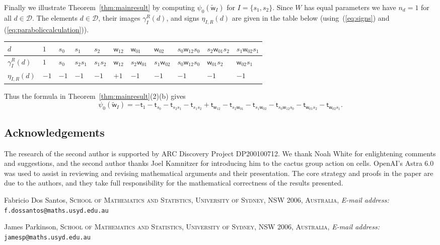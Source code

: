 \documentclass[11pt]{article}
\theoremstyle{plain}
\theoremstyle{definition}
\numberwithin{equation}{section}
\def\tw{\widetilde{\mathsf{w}}_I}
\def\cD{\mathcal{D}}
\newcommand{\sw}{\mathsf{w}}
\newcommand{\st}{\mathsf{t}}
\begin{document}
Finally we illustrate Theorem~\ref{thm:mainresult} by computing $\psi_0(\tw)$ for $I=\{s_1,s_2\}$. Since $W$ has equal parameters we have $n_d=1$ for all $d\in\cD$. The elements $d\in\cD$, their images $\gamma_I^R(d)$, and signs $\eta_{I,R}(d)$ are given in the table below (using~(\ref{eq:signs}) and (\ref{eq:paraboliccalculation})). 
\begin{center}
\begin{tabular}{l||l|l|l|l|l|l|l|l|l|l|}
$d$&$1$&$s_0$&$s_1$&$s_2$&$\sw_{12}$&$\sw_{01}$&$\sw_{02}$&$s_0\sw_{12}s_0$&$s_2\sw_{01}s_2$&$s_1\sw_{02}s_1$\\
\hline
$\gamma_I^R(d)$&$1$&$s_0$&$s_2s_1$&$s_1s_2$&$\sw_{12}$&$s_2\sw_{01}$&$s_1\sw_{02}$&$s_0\sw_{12}s_0$&$\sw_{01}s_2$&$\sw_{02}s_1$\\
\hline
$\eta_{I,R}(d)$&$-1$&$-1$&$-1$&$-1$&$+1$&$-1$&$-1$&$-1$&$-1$&$-1$\\
\hline
\end{tabular}
\end{center}
Thus the formula in Theorem~\ref{thm:mainresult}(2)(b) gives
$$
\psi_0(\tw)=-\st_1-\st_{s_0}-\st_{s_2s_1}-\st_{s_1s_2}+\st_{\sw_{12}}-\st_{s_2\sw_{01}}-\st_{s_1\sw_{02}}-\st_{s_0\sw_{12}s_0}-\st_{\sw_{01}s_2}-\st_{\sw_{02}s_1}.
$$


\subsection*{Acknowledgements} The research of the second author is supported by ARC Discovery Project DP200100712. We thank Noah White for enlightening comments and suggestions, and the second author thanks Joel Kamnitzer for introducing him to the cactus group action on cells. OpenAI's Astra 6.0 was used to assist in reviewing and revising mathematical arguments and their presentation. The core strategy and proofs in the paper are due to the authors, and they take full responsibility for the mathematical correctness of the results presented. 





\bigskip
  \footnotesize
  
   \noindent Fabricio Dos Santos, \textsc{School of Mathematics and Statistics, University of Sydney, NSW 2006, Australia}, \textit{E-mail address:} \texttt{f.dossantos@maths.usyd.edu.au}
   \smallskip
 
 \noindent James Parkinson, \textsc{School of Mathematics and Statistics, University of Sydney, NSW 2006, Australia}, 
 \noindent \textit{E-mail address:} \texttt{jamesp@maths.usyd.edu.au}
 
\end{document}
